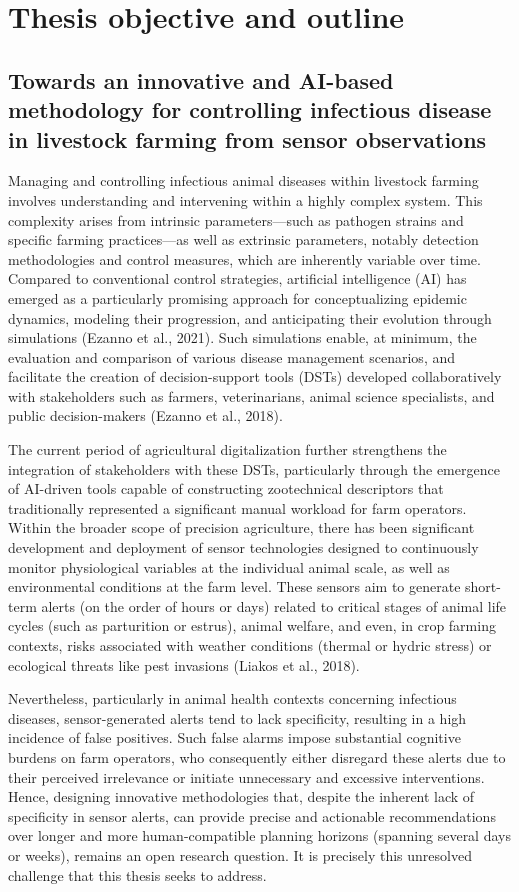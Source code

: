 \section{Thesis objective and outline}
\subsection{Towards an innovative and AI-based methodology for controlling infectious disease in livestock farming from sensor observations}

Managing and controlling infectious animal diseases within livestock farming involves understanding and intervening within a highly complex system. This complexity arises from intrinsic parameters—such as pathogen strains and specific farming practices—as well as extrinsic parameters, notably detection methodologies and control measures, which are inherently variable over time. Compared to conventional control strategies, artificial intelligence (AI) has emerged as a particularly promising approach for conceptualizing epidemic dynamics, modeling their progression, and anticipating their evolution through simulations (Ezanno et al., 2021). Such simulations enable, at minimum, the evaluation and comparison of various disease management scenarios, and facilitate the creation of decision-support tools (DSTs) developed collaboratively with stakeholders such as farmers, veterinarians, animal science specialists, and public decision-makers (Ezanno et al., 2018).

The current period of agricultural digitalization further strengthens the integration of stakeholders with these DSTs, particularly through the emergence of AI-driven tools capable of constructing zootechnical descriptors that traditionally represented a significant manual workload for farm operators. Within the broader scope of precision agriculture, there has been significant development and deployment of sensor technologies designed to continuously monitor physiological variables at the individual animal scale, as well as environmental conditions at the farm level. These sensors aim to generate short-term alerts (on the order of hours or days) related to critical stages of animal life cycles (such as parturition or estrus), animal welfare, and even, in crop farming contexts, risks associated with weather conditions (thermal or hydric stress) or ecological threats like pest invasions (Liakos et al., 2018).

Nevertheless, particularly in animal health contexts concerning infectious diseases, sensor-generated alerts tend to lack specificity, resulting in a high incidence of false positives. Such false alarms impose substantial cognitive burdens on farm operators, who consequently either disregard these alerts due to their perceived irrelevance or initiate unnecessary and excessive interventions. Hence, designing innovative methodologies that, despite the inherent lack of specificity in sensor alerts, can provide precise and actionable recommendations over longer and more human-compatible planning horizons (spanning several days or weeks), remains an open research question. It is precisely this unresolved challenge that this thesis seeks to address.

